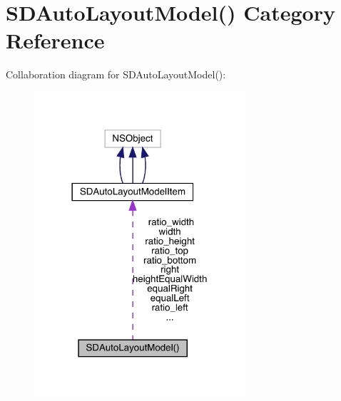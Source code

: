 \hypertarget{category_s_d_auto_layout_model_07_08}{}\section{S\+D\+Auto\+Layout\+Model() Category Reference}
\label{category_s_d_auto_layout_model_07_08}


Collaboration diagram for S\+D\+Auto\+Layout\+Model()\+:\nopagebreak
\begin{figure}[H]
\begin{center}
\leavevmode
\includegraphics[width=222pt]{category_s_d_auto_layout_model_07_08__coll__graph}
\end{center}
\end{figure}
